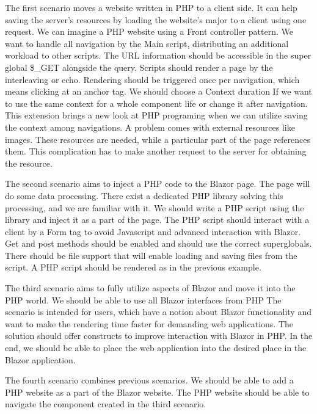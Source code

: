 The first scenario moves a website written in PHP to a client side.
It can help saving the server's resources by loading the website's major to a client using one request.
We can imagine a PHP website using a Front controller pattern.
We want to handle all navigation by the Main script, distributing an additional workload to other scripts.
The URL information should be accessible in the super global \$\_GET alongside the query.
Scripts should render a page by the interleaving or echo.
Rendering should be triggered once per navigation, which means clicking at an anchor tag.
We should choose a Context duration If we want to use the same context for a whole component life or change it after navigation.
This extension brings a new look at PHP programing when we can utilize saving the context among navigations.
A problem comes with external resources like images.
These resources are needed, while a particular part of the page references them.
This complication has to make another request to the server for obtaining the resource.
\par
The second scenario aims to inject a PHP code to the Blazor page.
The page will do some data processing.
There exist a dedicated PHP library solving this processing, and we are familiar with it.
We should write a PHP script using the library and inject it as a part of the page.
The PHP script should interact with a client by a Form tag to avoid Javascript and advanced interaction with Blazor.
Get and post methods should be enabled and should use the correct superglobals.
There should be file support that will enable loading and saving files from the script.
A PHP script should be rendered as in the previous example.
\par
The third scenario aims to fully utilize aspects of Blazor and move it into the PHP world.
We should be able to use all Blazor interfaces from PHP
The scenario is intended for users, which have a notion about Blazor functionality and want to make the rendering time faster for demanding web applications.
The solution should offer constructs to improve interaction with Blazor in PHP.
In the end, we should be able to place the web application into the desired place in the Blazor application.
\par
The fourth scenario combines previous scenarios.
We should be able to add a PHP website as a part of the Blazor website.
The PHP website should be able to navigate the component created in the third scenario.

